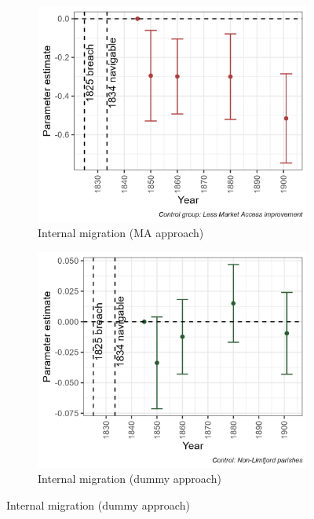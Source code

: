 \documentclass[11pt]{article}
\begin{document}
\begin{figure}
\begin{subfigure}[b]{0.45\textwidth}
    \end{subfigure}
    \vspace{0.45cm}
    \begin{subfigure}[b]{0.45\textwidth}
        \centering
        \caption{Internal migration (MA approach)} \label{fig:migr_ma}
        \includegraphics[width=\textwidth]{Plots/Mechanism/born_different_share_MA.png}
    \end{subfigure}
    \hfill
    \begin{subfigure}[b]{0.45\textwidth}
        \centering
        \caption{Internal migration (dummy approach)} \label{fig:migr_dummy}
        \includegraphics[width=\textwidth]{Plots/Mechanism/born_different_share_Dummy.png}

\end{subfigure}
\end{figure}
\end{document}
